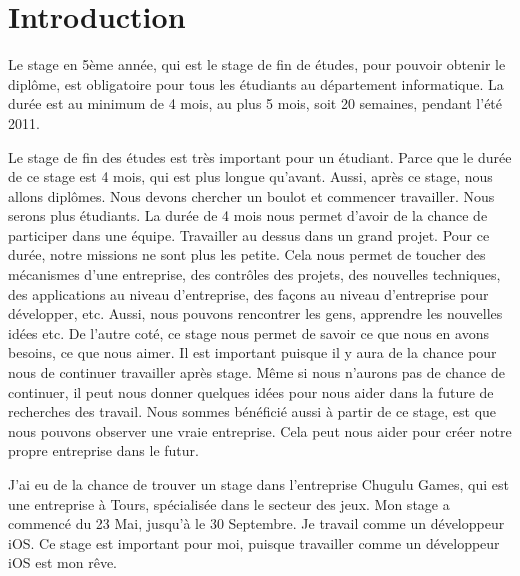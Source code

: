 \chapter{Introduction} %

Le stage en 5ème année, qui est le stage de fin de études, pour pouvoir obtenir le diplôme, est obligatoire pour tous les étudiants au département informatique. La durée est au minimum de 4 mois, au plus 5 mois, soit 20 semaines, pendant l’été 2011. 

Le stage de fin des études est très important pour un étudiant. Parce que le durée de ce stage est 4 mois, qui est plus longue qu'avant. Aussi, après ce stage, nous allons diplômes. Nous devons chercher un boulot et commencer travailler. Nous serons plus étudiants. La durée de 4 mois nous permet d'avoir de la chance de participer dans une équipe. Travailler au dessus dans un grand projet. Pour ce durée, notre missions ne sont plus les petite. Cela nous permet de toucher des mécanismes d'une entreprise, des contrôles des projets, des nouvelles techniques, des applications au niveau d'entreprise, des façons au niveau d'entreprise pour développer, etc. Aussi, nous pouvons rencontrer les gens, apprendre les nouvelles idées etc. De l'autre coté, ce stage nous permet de savoir ce que nous en avons besoins, ce que nous aimer. Il est important puisque il y aura de la chance pour nous de continuer travailler après stage. Même si nous n'aurons pas de chance de continuer, il peut nous donner quelques idées pour nous aider dans la future de recherches des travail. Nous sommes bénéficié aussi à partir de ce stage, est que nous pouvons observer une vraie entreprise. Cela peut nous aider pour créer notre propre entreprise dans le futur.

J’ai eu de la chance de trouver un stage dans l’entreprise Chugulu Games, qui est une entreprise à Tours, spécialisée dans le secteur des jeux. Mon stage a commencé du 23 Mai, jusqu'à le 30 Septembre. Je travail comme un développeur iOS. Ce stage est important pour moi, puisque travailler comme un développeur iOS est mon rêve. 

